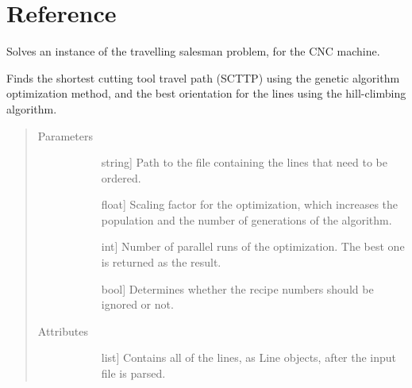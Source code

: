 \documentclass[letterpaper,10pt,english,openany,oneside]{sphinxmanual}
\begin{document}
\chapter{Reference}
\label{\detokenize{reference:module-cnc.optimization}}\label{\detokenize{reference:reference}}\label{\detokenize{reference::doc}}

\begin{fulllineitems}
\label{\detokenize{reference:cnc.optimization.CNCOptimizer}}
Solves an instance of the travelling salesman problem, for the CNC machine.

Finds the shortest cutting tool travel path (SCTTP) using the genetic
algorithm optimization method, and the best orientation for the lines using
the hill-climbing algorithm.
\begin{quote}\begin{description}
\item[{Parameters}] \leavevmode\begin{description}
\item[{}] \leavevmode{[}string{]}
Path to the file containing the lines that need to be ordered.

\item[{}] \leavevmode{[}float{]}
Scaling factor for the optimization, which increases the population and
the number of generations of the algorithm.

\item[{}] \leavevmode{[}int{]}
Number of parallel runs of the optimization. The best one is returned
as the result.

\item[{}] \leavevmode{[}bool{]}
Determines whether the recipe numbers should be ignored or not.

\end{description}

\item[{Attributes}] \leavevmode\begin{description}
\item[{}] \leavevmode{[}list{]}
Contains all of the lines, as Line objects, after the input file is
parsed.


\end{description}
\end{description}
\end{quote}
\end{fulllineitems}
\end{document}
